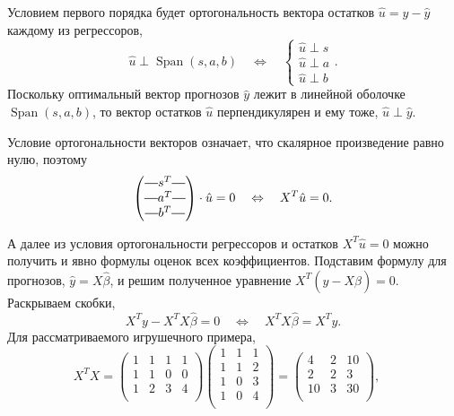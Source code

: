 \documentclass[12pt]{article}
\DeclareMathOperator{\Span}{Span}
\newcommand*{\horzbar}{\rule[.5ex]{2.5ex}{0.5pt}}
\newcommand{\hb}{\hat{\beta}}
\newcommand{\hu}{\hat{u}}
\newcommand{\hy}{\hat{y}}
\begin{document}

Условием первого порядка будет ортогональность вектора остатков $\hu = y - \hy$ каждому из регрессоров,
\[
\hu \perp \Span(s, a, b) \quad \Leftrightarrow \quad \begin{cases}
    \hu \perp s \\
    \hu \perp a \\
    \hu \perp b
\end{cases}.
\]
Поскольку оптимальный вектор прогнозов $\hy$ лежит в линейной оболочке $\Span(s, a, b)$, то вектор остатков $\hu$ перпендикулярен и ему тоже, $\hu \perp \hy$.

Условие ортогональности векторов означает, что скалярное произведение равно нулю, поэтому
\[
\begin{pmatrix}
    \horzbar s^T \horzbar \\
    \horzbar a^T \horzbar \\
    \horzbar b^T \horzbar \\
\end{pmatrix} \cdot \hu = 0 \quad \Leftrightarrow \quad X^T \hu = 0.
\]

А далее из условия ортогональности регрессоров и остатков $X^T \hu = 0$ можно получить и явно формулы оценок всех коэффициентов.
Подставим формулу для прогнозов, $\hy = X\hb$, и решим полученное уравнение $X^T (y - X\hb) = 0$.
Раскрываем скобки,
\[
X^T y - X^T X\hb = 0 \quad \Leftrightarrow \quad X^TX \hb = X^T y.
\]
Для рассматриваемого игрушечного примера,
\[
X^TX = \begin{pmatrix}
    1 & 1 & 1 & 1 \\
    1 & 1 & 0 & 0 \\
    1 & 2 & 3 & 4\\
\end{pmatrix}
\begin{pmatrix}
    1 & 1 & 1 \\
    1 & 1 & 2 \\
    1 & 0 & 3 \\
    1 & 0 & 4 \\
\end{pmatrix} = 
\begin{pmatrix}
    4 & 2 & 10 \\
    2 & 2 & 3 \\
    10 & 3 & 30 \\
\end{pmatrix}, \quad 
\]
\end{document}
